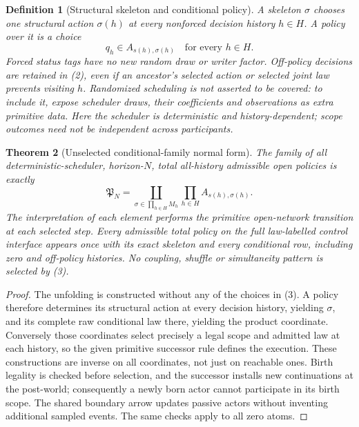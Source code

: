 \documentclass[11pt]{article}
\newtheorem{definition}{Definition}\newtheorem{theorem}[definition]{Theorem}\newtheorem{proposition}[definition]{Proposition}
\begin{document}
\begin{definition}[Structural skeleton and conditional policy]
A skeleton $\sigma$ chooses one structural action $\sigma(h)$ at every nonforced decision history $h\in H$. A policy over it is a choice
\[
 q_h\in A_{s(h),\sigma(h)}\quad\text{for every }h\in H. \tag{2}
\]
Forced status tags have no new random draw or writer factor. Off-policy decisions are retained in (2), even if an ancestor's selected action or selected joint law prevents visiting $h$. Randomized scheduling is not asserted to be covered: to include it, expose scheduler draws, their coefficients and observations as extra primitive data. Here the scheduler is deterministic and history-dependent; scope outcomes need not be independent across participants.
\end{definition}

\begin{theorem}[Unselected conditional-family normal form]
The family of all deterministic-scheduler, horizon-$N$, total all-history admissible open policies is exactly
\[
 \mathfrak P_N=\coprod_{\sigma\in\prod_{h\in H}M_h}
                     \prod_{h\in H} A_{s(h),\sigma(h)}. \tag{3}
\]
The interpretation of each element performs the primitive open-network transition at each selected step. Every admissible total policy on the full law-labelled control interface appears once with its exact skeleton and every conditional row, including zero and off-policy histories. No coupling, shuffle or simultaneity pattern is selected by (3).
\end{theorem}
\begin{proof}
The unfolding is constructed without any of the choices in (3). A policy therefore determines its structural action at every decision history, yielding $\sigma$, and its complete raw conditional law there, yielding the product coordinate. Conversely those coordinates select precisely a legal scope and admitted law at each history, so the given primitive successor rule defines the execution. These constructions are inverse on all coordinates, not just on reachable ones. Birth legality is checked before selection, and the successor installs new continuations at the post-world; consequently a newly born actor cannot participate in its birth scope. The shared boundary arrow updates passive actors without inventing additional sampled events. The same checks apply to all zero atoms.\end{proof}
\end{document}
